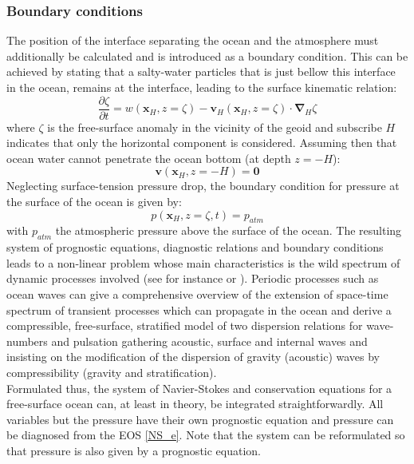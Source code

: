 \subsubsection{Boundary conditions}
The position of the interface separating the ocean and the atmosphere must additionally be calculated and is introduced as a boundary condition. This can be achieved by stating that a salty-water particles that is just bellow this interface in the ocean, remains at the interface, leading to the surface kinematic relation:
\begin{equation}
  \displaystyle
  \label{NS_BC2}
  \frac{\partial \zeta}{\partial t}=w(\mathbf{x}_{\scriptscriptstyle H},z=\zeta)-\mathbf{v}_H(\mathbf{x}_{\scriptscriptstyle H},z=\zeta)\cdot\mathbf{\nabla}_H\zeta
\end{equation}
where $\zeta$ is the free-surface anomaly in the vicinity of the geoid and subscribe $H$ indicates that only the horizontal component is considered. Assuming then that ocean water cannot penetrate the ocean bottom (at depth $z=-H$):
\begin{equation}
 \displaystyle
 \label{NS_BC0}
  \mathbf{v}(\mathbf{x}_{\scriptscriptstyle H},z=-H)=\mathbf{0}
\end{equation}
Neglecting surface-tension pressure drop, the boundary condition for pressure at the surface of the ocean is given by:
\begin{equation}
 \displaystyle
 \label{NS_BC1}
  p(\mathbf{x}_{\scriptscriptstyle H},z=\zeta,t)= p_{atm}
\end{equation}
with $p_{atm}$ the atmospheric pressure above the surface of the ocean.
The resulting system of prognostic equations, diagnostic relations and boundary conditions leads to a non-linear problem whose main characteristics is the wild spectrum of dynamic processes involved (see for instance \cite{gill_atmosphere-ocean_1982} or \cite{vallis_atmospheric_2006}). Periodic processes such as ocean waves can give a comprehensive overview of the extension of space-time spectrum of transient processes which can propagate in the ocean and \cite{auclair_modied_2021} derive a compressible, free-surface, stratified model of two dispersion relations for wave-numbers and pulsation gathering acoustic, surface and internal waves and insisting on the modification of the dispersion of gravity (acoustic) waves by compressibility (gravity and stratification).\\
Formulated thus, the system of Navier-Stokes and conservation equations for a free-surface ocean can, at least in theory, be integrated straightforwardly. All variables but the pressure have their own prognostic equation and pressure can be diagnosed from the EOS \ref{NS_e}. Note that the system can be reformulated so that pressure is also given by a prognostic equation.

